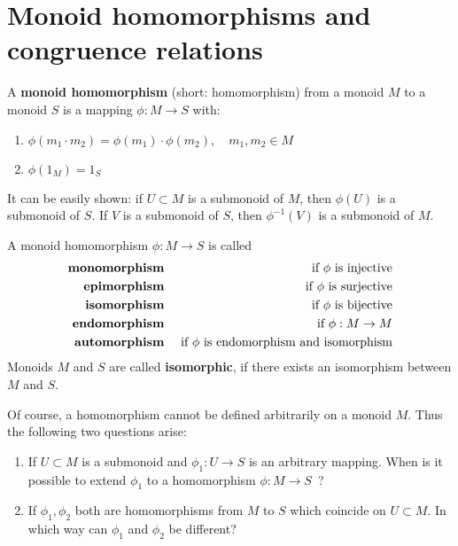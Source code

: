 \section{Monoid homomorphisms and congruence relations}

\begin{definition}
A {\bf monoid homomorphism} (short: homomorphism) from a monoid $M$ to a monoid
$S$ is a mapping $\phi : M \to S$ with:
\begin{enumerate}
  \item $\phi(m_1 \cdot m_2) = \phi(m_1) \cdot \phi(m_2), \quad m_1, m_2 \in M$
  \item $\phi(1_M) = 1_S$
\end{enumerate}
\end{definition}


It can be easily shown: if $U \subset M$ is a submonoid of $M$, then
$\phi(U)$ is a submonoid of $S$. If $V$ is a submonoid of $S$, then
$\phi^{-1}(V)$ is a submonoid of $M$.

A monoid homomorphism $\phi: M \to S$ is called
\begin{eqnarray*}
\text{\bf monomorphism} & & \text{ if $\phi$ is injective} \\
\text{\bf epimorphism} & & \text{ if $\phi$ is surjective} \\
\text{\bf isomorphism} & & \text{ if $\phi$ is bijective} \\
\text{\bf endomorphism} & & \text{ if $\phi: M\to M$} \\
\text{\bf automorphism} & & \text{ if $\phi$ is endomorphism and isomorphism} \\
\end{eqnarray*}
Monoids $M$ and $S$ are called {\bf isomorphic}, if there exists an
isomorphism between $M$ and $S$.

Of course, a homomorphism cannot be defined arbitrarily on a monoid $M$.
Thus the following two questions arise:
\begin{enumerate}
  \item If $U \subset M$ is a submonoid and $\phi_1 : U \to S$ is an arbitrary
mapping. When is it possible to extend $\phi_1$ to a homomorphism $\phi
: M \to S$\ ?
	\item If $\phi_1, \phi_2$ both are homomorphisms from $M$ to $S$ which
	coincide on $U \subset M$. In which way can $\phi_1$ and $\phi_2$ be
	different? 
\end{enumerate}

